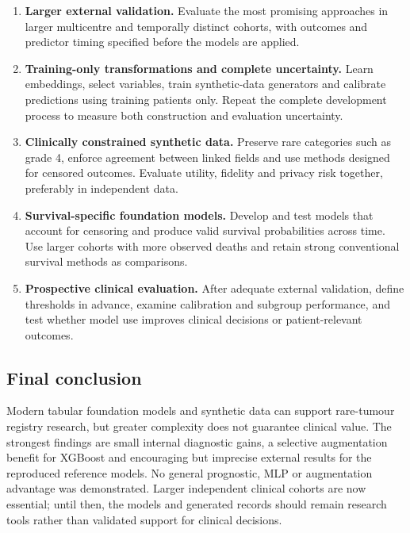 \begin{enumerate}[label=\textbf{P\arabic*.},ref=P\arabic*]
\item \textbf{Larger external validation.} Evaluate the most promising
approaches in larger multicentre and temporally distinct cohorts, with outcomes
and predictor timing specified before the models are applied.

\item \textbf{Training-only transformations and complete uncertainty.} Learn
embeddings, select variables, train synthetic-data generators and calibrate
predictions using training patients only. Repeat the complete development
process to measure both construction and evaluation uncertainty.

\item \textbf{Clinically constrained synthetic data.} Preserve rare categories
such as grade 4, enforce agreement between linked fields and use methods
designed for censored outcomes. Evaluate utility, fidelity and privacy risk
together, preferably in independent data.

\item \textbf{Survival-specific foundation models.} Develop and test models
that account for censoring and produce valid survival probabilities across time.
Use larger cohorts with more observed deaths and retain strong conventional
survival methods as comparisons.

\item \textbf{Prospective clinical evaluation.} After adequate external
validation, define thresholds in advance, examine calibration and subgroup
performance, and test whether model use improves clinical decisions or
patient-relevant outcomes.
\end{enumerate}

\subsection{Final conclusion}

Modern tabular foundation models and synthetic data can support rare-tumour
registry research, but greater complexity does not guarantee clinical value.
The strongest findings are small internal diagnostic gains, a selective
augmentation benefit for XGBoost and encouraging but imprecise external results
for the reproduced reference models. No general prognostic, MLP or augmentation
advantage was demonstrated. Larger independent clinical cohorts are now
essential; until then, the models and generated records should remain research
tools rather than validated support for clinical decisions.
